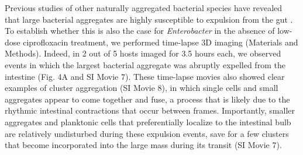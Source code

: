 Previous studies of other naturally aggregated bacterial species have revealed that large bacterial aggregates are highly susceptible to expulsion from the gut \cite{wiles_host_2016,Logan2018}. To establish whether this is also the case for \textit{Enterobacter} in the absence of low-dose ciprofloxacin treatment, we performed time-lapse 3D imaging (Materials and Methods). Indeed, in 2 out of 5 hosts imaged for 3.5 hours each, we observed events in which the largest bacterial aggregate was abruptly expelled from the intestine (Fig. 4A and SI Movie 7). These time-lapse movies also showed clear examples of cluster aggregation (SI Movie 8), in which single cells and small aggregates appear to come together and fuse, a process that is likely due to the rhythmic intestinal contractions that occur between frames. Importantly, smaller aggregates and planktonic cells that preferentially localize to the intestinal bulb are relatively undisturbed during these expulsion events, save for a few clusters that become incorporated into the large mass during its transit (SI Movie 7). 

